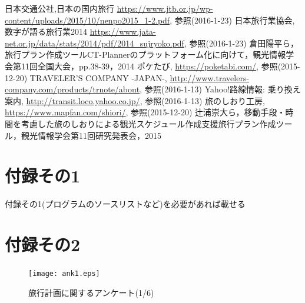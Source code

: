 \documentclass{funthesis}
\begin{document}
\begin{thebibliography}{9}
日本交通公社,日本の国内旅行  {\url{https://www.jtb.or.jp/wp-content/uploads/2015/10/nenpo2015_1-2.pdf}}, 参照(2016-1-23)
日本旅行業協会,数字が語る旅行業2014  {\url{https://www.jata-net.or.jp/data/stats/2014/pdf/2014_sujryoko.pdf}}, 参照(2016-1-23)
  倉田陽平ら，旅行プラン作成ツールCT-Plannerのプラットフォーム化に向けて，観光情報学会第11回全国大会，pp.38-39，2014
ポケたび,  {\url{https://poketabi.com/}}, 参照(2015-12-20)
TRAVELER'S COMPANY -JAPAN-,  {\url{http://www.travelers-company.com/products/trnote/about}}, 参照(2016-1-13)
Yahoo!路線情報: 乗り換え案内,  {\url{http://transit.loco.yahoo.co.jp/}}, 参照(2016-1-13)
旅のしおり工房,  {\url{https://www.mapfan.com/shiori/}}, 参照(2015-12-20)
 辻浦崇大ら，移動手段・時間を考慮した旅のしおりによる観光スケジュール作成支援旅行プラン作成ツール，観光情報学会第11回研究発表会，2015

\end{thebibliography}


\appendix

\chapter*{付録その1} %

付録その1(プログラムのソースリストなど)を必要があれば載せる

\chapter*{付録その2}

\begin{figure}[htpb]
\begin{center}
\texttt{[image: ank1.eps]}
\caption{旅行計画に関するアンケート(1/6)}
\end{center}
\end{figure}
\end{document}
